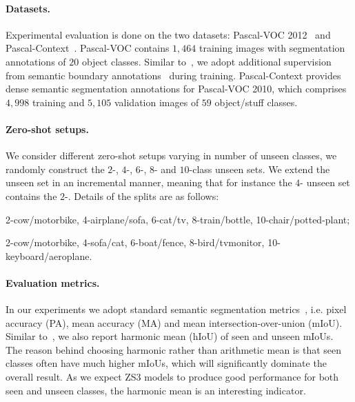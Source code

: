 \documentclass{article}
\begin{document}
\paragraph{Datasets.} Experimental evaluation is done on the two datasets: Pascal-VOC 2012~\cite{everingham2015pascal} and Pascal-Context~\cite{mottaghi2014role}.
Pascal-VOC contains $1,464$ training images with segmentation annotations of $20$ object classes.
Similar to~\cite{chen2018encoder}, we adopt additional supervision from semantic boundary annotations~\cite{hariharan2011semantic} during training.
Pascal-Context provides dense semantic segmentation annotations for Pascal-VOC 2010, which comprises $4,998$ training and $5,105$ validation images of $59$ object/stuff classes.


\vspace{-0.3cm}
\paragraph{Zero-shot setups.}
We consider different zero-shot setups varying in number of unseen classes, we randomly construct the $2$-, $4$-, $6$-, $8$- and $10$-class unseen sets.
We extend the unseen set in an incremental manner, meaning that for instance the $4$- unseen set contains the $2$-. Details of the splits are as follows:

\begin{description}[noitemsep,topsep=0pt]
\vspace{-0.1cm}
\small{
\item[\,\,\,\,\,\,\,\,\,\,\textit{Pascal-VOC:}] 2-cow/motorbike, 4-airplane/sofa, 6-cat/tv, 8-train/bottle, 10-chair/potted-plant; 
\item[\,\,\,\,\,\,\,\,\,\,\textit{Pascal-Context:}] 2-cow/motorbike, 4-sofa/cat, 6-boat/fence, 8-bird/tvmonitor, 10-keyboard/aeroplane.
}
\end{description}

\vspace{-0.3cm}
\paragraph{Evaluation metrics.}
In our experiments we adopt standard semantic segmentation metrics~\cite{long2015fully}, i.e. pixel accuracy (PA), mean accuracy (MA) and mean intersection-over-union (mIoU).
Similar to~\cite{xian2018zero}, we also report harmonic mean (hIoU) of seen and unseen mIoUs.
The reason behind choosing harmonic rather than arithmetic mean is that seen classes often have much higher mIoUs, which will significantly dominate the overall result.
As we expect ZS3 models to produce good performance for both seen and unseen classes, the harmonic mean is an interesting indicator.
 
\end{document}
